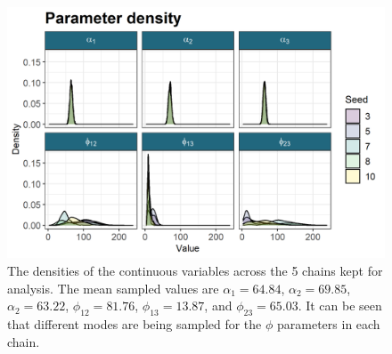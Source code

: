 \documentclass[]{article}
\begin{document}
\begin{figure}
	\centering
	\includegraphics[scale=1]{./Images/Yeast/densityPlotReduced.png}
	\caption{The densities of the continuous variables across the 5 chains kept for analysis. The mean sampled values are $\alpha_1= 64.84$, $\alpha_2 = 69.85$, $\alpha_2 = 63.22$, $\phi_{12} = 81.76$, $\phi_{13} = 13.87$, and $\phi_{23} = 65.03$. It can be seen that different modes are being sampled for the $\phi$ parameters in each chain.
	}
	\label{fig:bayesDensities}
\end{figure}
\end{document}
